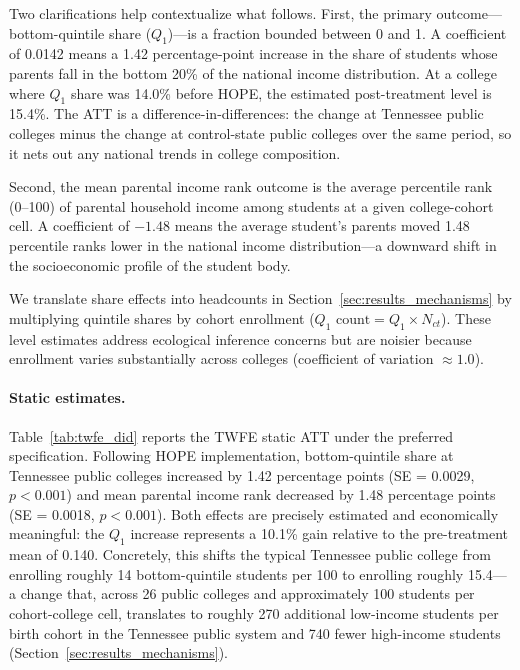 Two clarifications help contextualize what follows. First, the
primary outcome---bottom-quintile share ($Q_1$)---is a fraction
bounded between 0 and 1. A coefficient of 0.0142 means a 1.42
percentage-point increase in the share of students whose parents
fall in the bottom 20\% of the national income distribution. At a
college where $Q_1$ share was 14.0\% before HOPE, the estimated
post-treatment level is 15.4\%. The ATT is a
difference-in-differences: the change at Tennessee public colleges
minus the change at control-state public colleges over the same
period, so it nets out any national trends in college composition.

Second, the mean parental income rank outcome is the average
percentile rank (0--100) of parental household income among students
at a given college-cohort cell. A coefficient of $-1.48$ means the
average student's parents moved 1.48 percentile ranks lower in the
national income distribution---a downward shift in the
socioeconomic profile of the student body.

We translate share effects into headcounts in
Section~\ref{sec:results_mechanisms} by multiplying quintile shares
by cohort enrollment ($Q_1 \text{ count} = Q_1 \times N_{ct}$).
These level estimates address ecological inference concerns but are
noisier because enrollment varies substantially across colleges
(coefficient of variation $\approx 1.0$).

\paragraph{Static estimates.}

Table~\ref{tab:twfe_did} reports the TWFE static ATT under the
preferred specification. Following HOPE implementation,
bottom-quintile share at Tennessee public colleges increased by
1.42 percentage points (SE = 0.0029, $p < 0.001$) and mean parental
income rank decreased by 1.48 percentage points (SE = 0.0018,
$p < 0.001$). Both effects are precisely estimated and economically
meaningful: the $Q_1$ increase represents a 10.1\% gain relative to
the pre-treatment mean of 0.140. Concretely, this shifts the typical
Tennessee public college from enrolling roughly 14 bottom-quintile
students per 100 to enrolling roughly 15.4---a change that, across 26
public colleges and approximately 100 students per cohort-college
cell, translates to roughly 270 additional low-income students per
birth cohort in the Tennessee public system and 740 fewer high-income
students (Section~\ref{sec:results_mechanisms}).

